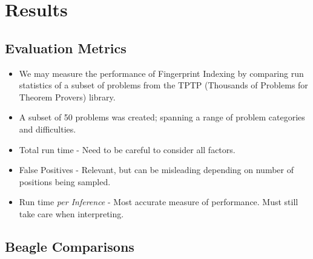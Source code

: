 \documentclass[10pt,xcolor={dvipsnames}]{beamer}
\begin{document}
\begin{NoHyper}
\begin{frame}
\end{frame}


\section{Results}

\subsection{Evaluation Metrics}
\begin{frame}
  \begin{itemize}
  \frametitle{Metrics for Analysing Indexing Performance}
  \item<1-> We may measure the performance of Fingerprint Indexing by comparing
  run statistics of a subset of problems from the TPTP (Thousands of Problems for Theorem Provers)
  library.
  \item<1-> A subset of 50 problems was created; spanning a range of problem categories
  and difficulties.
  \item<2-> Total run time - Need to be careful to consider all factors.
  \item<3-> False Positives - Relevant, but can be misleading depending on
  number of positions being sampled.
  \item<4-> Run time \emph{per Inference} - Most accurate measure of performance.
  Must still take care when interpreting.
  \end{itemize}
\end{frame}


\subsection{Beagle Comparisons}


\end{NoHyper}
\end{document}
